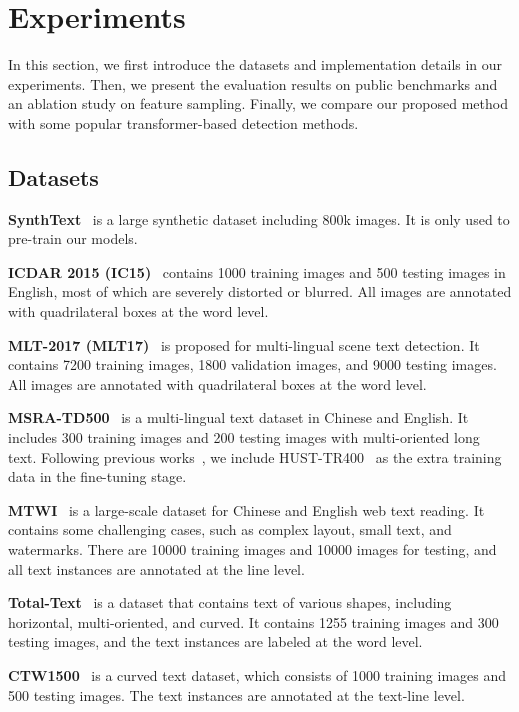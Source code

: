 \documentclass[10pt,twocolumn,letterpaper]{article}
\begin{document}
\section{Experiments}
\label{sec:exp}

In this section, we first introduce the datasets and implementation details in our experiments.
Then, we present the evaluation results on public benchmarks and an ablation study on feature sampling.
Finally, we compare our proposed method with some popular transformer-based detection methods.

\subsection{Datasets}

\textbf{SynthText}~\cite{SynthText} is a large synthetic dataset including 800k images. It is only used to pre-train our models.

\textbf{ICDAR 2015 (IC15)}~\cite{ic15} contains 1000 training images and 500 testing images in English, most of which are severely distorted or blurred.
All images are annotated with quadrilateral boxes at the word level.

\textbf{MLT-2017 (MLT17)}~\cite{MLT17} is proposed for multi-lingual scene text detection.
It contains 7200 training images, 1800 validation images, and 9000 testing images. 
All images are annotated with quadrilateral boxes at the word level.

\textbf{MSRA-TD500}~\cite{TD500} is a multi-lingual text dataset in Chinese and English. 
It includes 300 training images and 200 testing images with multi-oriented long text.
Following previous works~\cite{MOST,TextSnake,DB}, we include HUST-TR400~\cite{TR400} as the extra training data in the fine-tuning stage.

\textbf{MTWI}~\cite{MTWI} is a large-scale dataset for Chinese and English web text reading. It contains some challenging cases, such as complex layout, small text, and watermarks.
There are 10000 training images and 10000 images for testing, and all text instances are annotated at the line level.

\textbf{Total-Text}~\cite{totaltext} is a dataset that contains text of various shapes, including horizontal, multi-oriented, and curved. It contains 1255 training images and 300 testing images, and the text instances are labeled at the word level.

\textbf{CTW1500}~\cite{ctw1500} is a curved text dataset, which consists of 1000 training images and 500 testing images. The text instances are annotated at the text-line level. 
\end{document}
